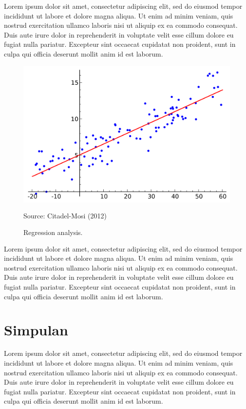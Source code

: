 \documentclass[12pt,hidelinks]{report}
\begin{document}
    Lorem ipsum dolor sit amet, consectetur adipiscing elit, sed do eiusmod tempor incididunt ut labore et dolore magna aliqua. Ut enim ad minim veniam, quis nostrud exercitation ullamco laboris nisi ut aliquip ex ea commodo consequat. Duis aute irure dolor in reprehenderit in voluptate velit esse cillum dolore eu fugiat nulla pariatur. Excepteur sint occaecat cupidatat non proident, sunt in culpa qui officia deserunt mollit anim id est laborum.

\begin{figure}[t]
\includegraphics[width=\textwidth]{regression.png}
    \caption{Regression analysis.}
Source: Citadel-Mosi (2012)
    \label{tab:fig2}
\centering
\end{figure}

    Lorem ipsum dolor sit amet, consectetur adipiscing elit, sed do eiusmod tempor incididunt ut labore et dolore magna aliqua. Ut enim ad minim veniam, quis nostrud exercitation ullamco laboris nisi ut aliquip ex ea commodo consequat. Duis aute irure dolor in reprehenderit in voluptate velit esse cillum dolore eu fugiat nulla pariatur. Excepteur sint occaecat cupidatat non proident, sunt in culpa qui officia deserunt mollit anim id est laborum.

\chapter{Simpulan}
    Lorem ipsum dolor sit amet, consectetur adipiscing elit, sed do eiusmod tempor incididunt ut labore et dolore magna aliqua. Ut enim ad minim veniam, quis nostrud exercitation ullamco laboris nisi ut aliquip ex ea commodo consequat. Duis aute irure dolor in reprehenderit in voluptate velit esse cillum dolore eu fugiat nulla pariatur. Excepteur sint occaecat cupidatat non proident, sunt in culpa qui officia deserunt mollit anim id est laborum.
\end{document}
